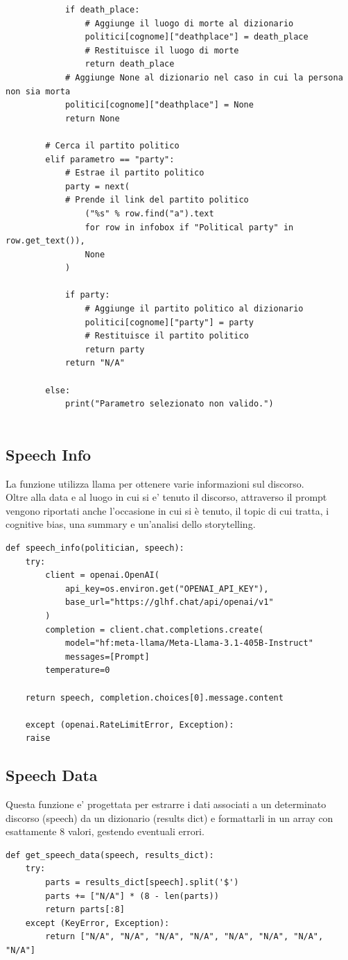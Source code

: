 \documentclass{article}
\begin{document}
\begin{lstlisting}
			if death_place:
				# Aggiunge il luogo di morte al dizionario
				politici[cognome]["deathplace"] = death_place
				# Restituisce il luogo di morte
				return death_place
			# Aggiunge None al dizionario nel caso in cui la persona non sia morta
			politici[cognome]["deathplace"] = None
			return None

		# Cerca il partito politico
		elif parametro == "party":
			# Estrae il partito politico
			party = next(
			# Prende il link del partito politico
				("%s" % row.find("a").text
				for row in infobox if "Political party" in row.get_text()), 
				None
			)

			if party:
				# Aggiunge il partito politico al dizionario
				politici[cognome]["party"] = party
				# Restituisce il partito politico
				return party
			return "N/A"

		else:
			print("Parametro selezionato non valido.")
	
		\end{lstlisting}

		\subsection{Speech Info}
La funzione utilizza llama per ottenere varie informazioni sul discorso.\\
Oltre alla data e al luogo in cui si e' tenuto il discorso, attraverso il prompt vengono riportati anche l'occasione in cui si è tenuto, il topic di cui tratta, i cognitive bias, una summary e un'analisi dello storytelling.
		\begin{lstlisting}
def speech_info(politician, speech):
	try:
		client = openai.OpenAI(
			api_key=os.environ.get("OPENAI_API_KEY"),
			base_url="https://glhf.chat/api/openai/v1"
		)
		completion = client.chat.completions.create(
			model="hf:meta-llama/Meta-Llama-3.1-405B-Instruct"
			messages=[Prompt]
		temperature=0
		
	return speech, completion.choices[0].message.content
	
	except (openai.RateLimitError, Exception):
	raise
		\end{lstlisting}
\newpage		
		\subsection{Speech Data}
		Questa funzione e' progettata per estrarre i dati associati a un determinato discorso (speech) da un dizionario (results dict) e formattarli in un array con esattamente 8 valori, gestendo eventuali errori.
		\begin{lstlisting}
def get_speech_data(speech, results_dict):
	try:
		parts = results_dict[speech].split('$')
		parts += ["N/A"] * (8 - len(parts))
		return parts[:8]
	except (KeyError, Exception):
		return ["N/A", "N/A", "N/A", "N/A", "N/A", "N/A", "N/A", "N/A"]

		\end{lstlisting}
		
\end{document}
